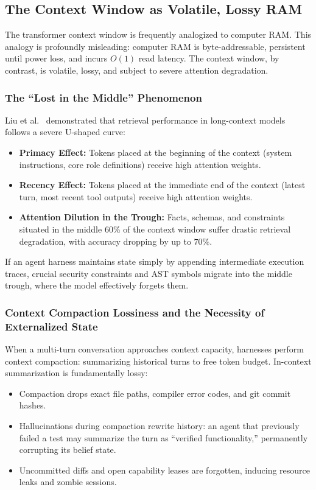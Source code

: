 \documentclass[11pt,a4paper]{article}
\begin{document}
\subsection{The Context Window as Volatile, Lossy RAM}

The transformer context window is frequently analogized to computer RAM. This analogy is profoundly misleading: computer RAM is byte-addressable, persistent until power loss, and incurs $O(1)$ read latency. The context window, by contrast, is volatile, lossy, and subject to severe attention degradation.

\subsubsection{The ``Lost in the Middle'' Phenomenon}
Liu et al.~ demonstrated that retrieval performance in long-context models follows a severe U-shaped curve:
\begin{itemize}[leftmargin=1.8em,itemsep=2pt]
  \item \textbf{Primacy Effect:} Tokens placed at the beginning of the context (system instructions, core role definitions) receive high attention weights.
  \item \textbf{Recency Effect:} Tokens placed at the immediate end of the context (latest turn, most recent tool outputs) receive high attention weights.
  \item \textbf{Attention Dilution in the Trough:} Facts, schemas, and constraints situated in the middle 60\% of the context window suffer drastic retrieval degradation, with accuracy dropping by up to $70\%$.
\end{itemize}
If an agent harness maintains state simply by appending intermediate execution traces, crucial security constraints and AST symbols migrate into the middle trough, where the model effectively forgets them.

\subsubsection{Context Compaction Lossiness and the Necessity of Externalized State}
When a multi-turn conversation approaches context capacity, harnesses perform context compaction: summarizing historical turns to free token budget. In-context summarization is fundamentally lossy:
\begin{itemize}[leftmargin=1.8em,itemsep=2pt]
  \item Compaction drops exact file paths, compiler error codes, and git commit hashes.
  \item Hallucinations during compaction rewrite history: an agent that previously failed a test may summarize the turn as ``verified functionality,'' permanently corrupting its belief state.
  \item Uncommitted diffs and open capability leases are forgotten, inducing resource leaks and zombie sessions.
\end{itemize}
\end{document}
